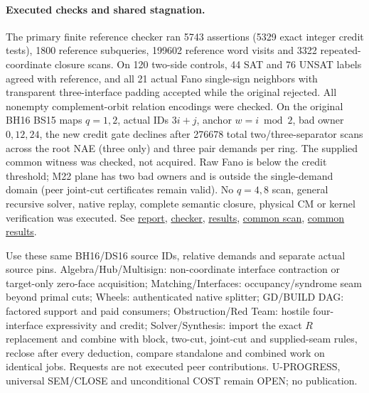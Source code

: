 \documentclass[11pt]{article}
\begin{document}
\paragraph{Executed checks and shared stagnation.}
The primary finite reference checker ran 5743 assertions (5329 exact integer credit tests), 1800 reference subqueries, 199602 reference word visits and 3322 repeated-coordinate closure scans. On 120 two-side controls, 44 SAT and 76 UNSAT labels agreed with reference, and all 21 actual Fano single-sign neighbors with transparent three-interface padding accepted while the original rejected. All nonempty complement-orbit relation encodings were checked. On the original BH16 BS15 maps $q=1,2$, actual IDs $3i+j$, anchor $w=i\bmod2$, bad owner $0,12,24$, the new credit gate declines after 276678 total two/three-separator scans across the root NAE (three only) and three pair demands per ring. The supplied common witness was checked, not acquired. Raw Fano is below the credit threshold; M22 plane has two bad owners and is outside the single-demand domain (peer joint-cut certificates remain valid). No $q=4,8$ scan, general recursive solver, native replay, complete semantic closure, physical CM or kernel verification was executed. See \href{https://github.com/j15marti/pnp/commit/e99f6a35262516747dcf3f170e601e78fbea6e80}{report}, \href{https://github.com/j15marti/pnp/commit/6c86c252054fb14e23bbbbbf603a698ec664b087}{checker}, \href{https://github.com/j15marti/pnp/commit/57005787ddb4aa6b5f95d2a91dc417696b7796ab}{results}, \href{https://github.com/j15marti/pnp/commit/3d081b5cb1da183a69acbc32a3d478ab5021f6b2}{common scan}, \href{https://github.com/j15marti/pnp/commit/1a41d43b9d7951b525c77c7f0518ebb16c4b24ec}{common results}.

Use these same BH16/DS16 source IDs, relative demands and separate actual source pins. Algebra/Hub/Multisign: non-coordinate interface contraction or target-only zero-face acquisition; Matching/Interfaces: occupancy/syndrome seam beyond primal cuts; Wheels: authenticated native splitter; GD/BUILD DAG: factored support and paid consumers; Obstruction/Red Team: hostile four-interface expressivity and credit; Solver/Synthesis: import the exact $R$ replacement and combine with block, two-cut, joint-cut and supplied-seam rules, reclose after every deduction, compare standalone and combined work on identical jobs. Requests are not executed peer contributions. U-PROGRESS, universal SEM/CLOSE and unconditional COST remain OPEN; no publication.
\end{document}

